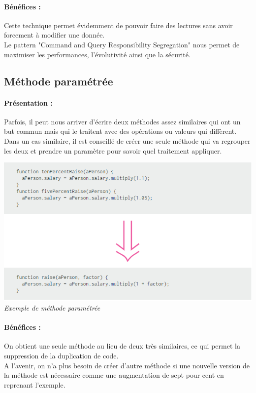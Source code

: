 \documentclass[a4paper,twoside,12pt,openright]{report}
\begin{document}
\paragraph{Bénéfices :}
Cette technique permet évidemment de pouvoir faire des lectures sans avoir forcement à modifier une donnée.\\
Le pattern "Command and Query Responsibility Segregation" nous permet de maximiser les performances, l'évolutivité ainsi que la sécurité.\\

\newpage

\subsection{Méthode paramétrée}
\paragraph{Présentation :}
Parfois, il peut nous arriver d'écrire deux méthodes assez similaires qui ont un but commun mais qui le traitent avec des opérations ou valeurs qui diffèrent. Dans un cas similaire, il est conseillé de créer une seule méthode qui va regrouper les deux et prendre un paramètre pour savoir quel traitement appliquer.\\

\begin{center}
\includegraphics[scale=1]{Image/Methode_Parametre.png}\\
\itshape{Exemple de méthode paramétrée \cite{ref8}}
\end{center}

\paragraph{Bénéfices :}
On obtient une seule méthode au lieu de deux très similaires, ce qui permet la suppression de la duplication de code.\\
A l'avenir, on n'a plus besoin de créer d'autre méthode si une nouvelle version de la méthode est nécessaire comme une augmentation de sept pour cent en reprenant l'exemple.\\
\end{document}
